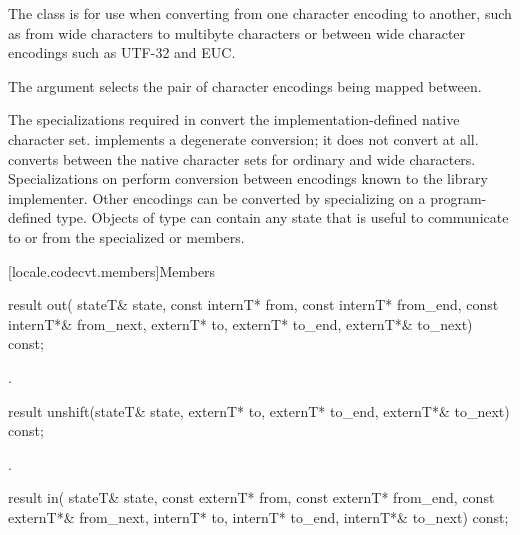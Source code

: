\pnum
The class  is for use
when converting from one character encoding to another,
such as from wide characters to multibyte characters or
between wide character encodings such as UTF-32 and EUC.

\pnum
The  argument selects
the pair of character encodings being mapped between.

\pnum
The specializations required
in 
convert the implementation-defined native character set.
 implements a degenerate conversion;
it does not convert at all.
converts between the native character sets for ordinary and wide characters.
Specializations on 
perform conversion between encodings known to the library implementer.
Other encodings can be converted by specializing on
a program-defined  type.
Objects of type  can contain any state
that is useful to communicate to or from
the specialized  or  members.

[locale.codecvt.members]{Members}

%
\begin{itemdecl}
result out(
  stateT& state,
  const internT* from, const internT* from_end, const internT*& from_next,
  externT* to, externT* to_end, externT*& to_next) const;
\end{itemdecl}

\begin{itemdescr}
\pnum
\returns
{}.
\end{itemdescr}

%
\begin{itemdecl}
result unshift(stateT& state, externT* to, externT* to_end, externT*& to_next) const;
\end{itemdecl}

\begin{itemdescr}
\pnum
\returns
{}.
\end{itemdescr}

%
\begin{itemdecl}
result in(
  stateT& state,
  const externT* from, const externT* from_end, const externT*& from_next,
  internT* to, internT* to_end, internT*& to_next) const;
\end{itemdecl}

